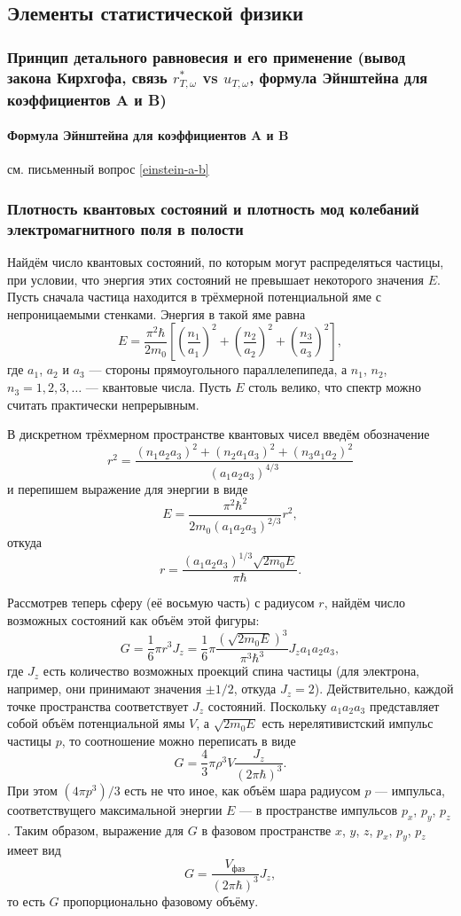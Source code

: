 \subsection{Элементы статистической физики}
\subsubsection{Принцип детального равновесия и его применение (вывод закона Кирхгофа, связь $r_{T, \omega}^*$ vs $u_{T, \omega}$, формула Эйнштейна для коэффициентов A и B)}
\paragraph{Формула Эйнштейна для коэффициентов A и B} см. письменный вопрос \ref{einstein-a-b}

\subsubsection{Плотность квантовых состояний и плотность мод колебаний электромагнитного поля в полости}
Найдём число квантовых состояний, по которым могут распределяться частицы, при
условии, что энергия этих состояний не превышает некоторого значения $ E $.
Пусть сначала частица находится в трёхмерной потенциальной яме с непроницаемыми
стенками. Энергия в такой яме равна 
\[
  E = \frac{\pi^2\hbar}{2m_0} \left[ \left( \frac{n_1}{a_1} \right)^2 + \left(
  \frac{n_2}{a_2}\right)^2 + \left( \frac{n_3}{a_3} \right)^2   \right],
\]
где $ a_1 $, $ a_2 $ и $ a_3 $ --- стороны прямоугольного параллелепипеда, а $
n_1 $, $ n_2 $, $ n_3 = 1, 2, 3,\ldots$ --- квантовые числа. Пусть $ E $ столь
велико, что спектр можно считать практически непрерывным.

В дискретном трёхмерном пространстве квантовых чисел введём обозначение  
\[
  r^2 = \frac{(n_1a_2a_3)^2 + (n_2a_1a_3)^2 + (n_3a_1a_2)^2}{(a_1a_2a_3)^{4/3}}
\]
и перепишем выражение для энергии в виде 
\[
  E = \frac{\pi^2\hbar^2}{2m_0(a_1a_2a_3)^{2/3}}r^2,
\]
откуда 
\[
  r = \frac{(a_1a_2a_3)^{1/3}\sqrt{2m_0E}}{\pi\hbar}.
\]

Рассмотрев теперь сферу (её восьмую часть) с радиусом $ r $, найдём число
возможных состояний как объём этой фигуры:
\[
  G = \frac{1}{6}\pi r^3 J_z = \frac{1}{6} \pi \frac{ \left( \sqrt{2m_0E}
  \right)^3 }{\pi^3\hbar^3}J_z a_1a_2a_3,
\]
где $ J_z $ есть количество возможных проекций спина частицы (для электрона,
например, они принимают значения $ \pm 1/2 $, откуда $ J_z = 2 $).
Действительно, каждой точке пространства соответствует $ J_z $ состояний.
Поскольку $ a_1a_2a_3 $ представляет собой объём потенциальной ямы $ V $, а $
\sqrt{2m_0E} $ есть нерелятивистский импульс частицы $ p $, то соотношение можно
переписать в виде 
\[
  G = \frac{4}{3} \pi \rho^3 V \frac{J_z}{(2\pi\hbar)^3}.
\]
При этом $ (4\pi p^3)/3 $ есть не что иное, как объём шара радиусом $ p $
--- импульса, соответствущего максимальной энергии $ E $ --- в пространстве
импульсов $ p_x $, $ p_y $, $ p_z $. Таким образом, выражение для $ G $ в
фазовом пространстве $ x $, $ y $, $ z $, $ p_x $, $ p_y $, $ p_z $ имеет вид 
\[
  G = \frac{V_{\text{фаз}}}{(2\pi \hbar)^3} J_z,
\]
то есть $ G $ пропорционально фазовому объёму.

